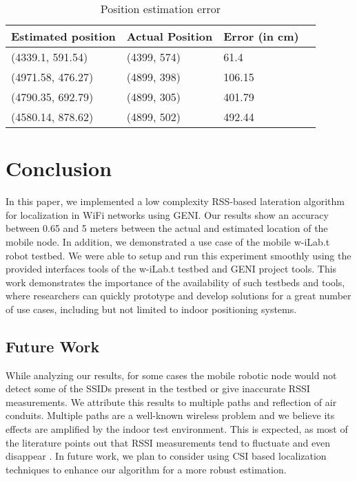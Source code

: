 \documentclass[journal]{IEEEtran} 				\IEEEoverridecommandlockouts 						\usepackage{amsmath,amssymb}
\begin{document}
\begin{table}[]
\centering
\caption{Position estimation error}
\label{my-label}
\begin{tabular}{llll}
\hline
Estimated position & Actual Position & Error (in cm)\\
\hline
(4339.1, 591.54)		& (4399, 574) & 61.4	\\
(4971.58, 476.27)		& (4899, 398) & 106.15	\\
(4790.35, 692.79)		& (4899, 305) & 401.79	\\
(4580.14, 878.62)		& (4899, 502) & 492.44	\\
\hline
\end{tabular}
\end{table}


\section{Conclusion}\label{sec:conclude}

In this paper, we implemented a low complexity RSS-based lateration algorithm for localization in WiFi networks using GENI. Our results show an accuracy between 0.65 and 5 meters between the actual and estimated location of the mobile node. In addition, we demonstrated a use case of the mobile w-iLab.t robot testbed. We were able to setup and run this experiment smoothly using the provided interfaces tools of the w-iLab.t testbed and GENI project tools. This work demonstrates the importance of the availability of such testbeds and tools, where researchers can quickly prototype and develop solutions for a great number of use cases, including but not limited to indoor positioning systems.

\subsection{Future Work}\label{sec:futurework}

While analyzing our results, for some cases the mobile robotic node would not detect some of the SSIDs present in the testbed or give inaccurate RSSI measurements. We attribute this results to multiple paths and reflection of air conduits. Multiple paths are a well-known wireless problem and we believe its effects are amplified by the indoor test environment. This is expected, as most of the literature points out that RSSI measurements tend to fluctuate and even disappear \cite{ChandrasekaranEYLCGM09}. In future work, we plan to consider using CSI based localization techniques to enhance our algorithm for a more robust estimation.
\end{document}
